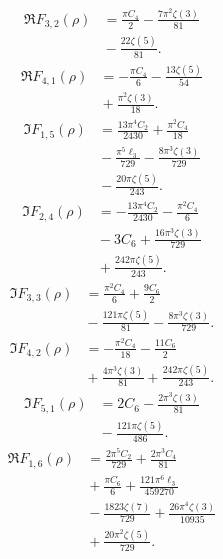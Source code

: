 \begin{align*}
\Re F_{3,2}(\rho) &=\frac{\pi C_{4}}{2}-\frac{7 \pi^{2} \zeta\left(3\right)}{81} \\
 &{}-\frac{22 \zeta\left(5\right)}{81}.
\end{align*}
\begin{align*}
\Re F_{4,1}(\rho) &=-\frac{\pi C_{4}}{6}-\frac{13 \zeta\left(5\right)}{54} \\
 &{}+\frac{\pi^{2} \zeta\left(3\right)}{18}.
\end{align*}
\begin{align*}
\Im F_{1,5}(\rho) &=\frac{13 \pi^{4} C_{2}}{2430}+\frac{\pi^{2} C_{4}}{18} \\
 &{}-\frac{\pi^{5} \ell_{3}}{729}-\frac{8 \pi^{3} \zeta\left(3\right)}{729} \\
 &{}-\frac{20 \pi \zeta\left(5\right)}{243}.
\end{align*}
\begin{align*}
\Im F_{2,4}(\rho) &=-\frac{13 \pi^{4} C_{2}}{2430}-\frac{\pi^{2} C_{4}}{6} \\
 &{}-3 C_{6}+\frac{16 \pi^{3} \zeta\left(3\right)}{729} \\
 &{}+\frac{242 \pi \zeta\left(5\right)}{243}.
\end{align*}
\begin{align*}
\Im F_{3,3}(\rho) &=\frac{\pi^{2} C_{4}}{6}+\frac{9 C_{6}}{2} \\
 &{}-\frac{121 \pi \zeta\left(5\right)}{81}-\frac{8 \pi^{3} \zeta\left(3\right)}{729}.
\end{align*}
\begin{align*}
\Im F_{4,2}(\rho) &=-\frac{\pi^{2} C_{4}}{18}-\frac{11 C_{6}}{2} \\
 &{}+\frac{4 \pi^{3} \zeta\left(3\right)}{81}+\frac{242 \pi \zeta\left(5\right)}{243}.
\end{align*}
\begin{align*}
\Im F_{5,1}(\rho) &=2 C_{6}-\frac{2 \pi^{3} \zeta\left(3\right)}{81} \\
 &{}-\frac{121 \pi \zeta\left(5\right)}{486}.
\end{align*}
\begin{align*}
\Re F_{1,6}(\rho) &=\frac{2 \pi^{5} C_{2}}{729}+\frac{2 \pi^{3} C_{4}}{81} \\
 &{}+\frac{\pi C_{6}}{6}+\frac{121 \pi^{6} \ell_{3}}{459270} \\
 &{}-\frac{1823 \zeta\left(7\right)}{729}+\frac{26 \pi^{4} \zeta\left(3\right)}{10935} \\
 &{}+\frac{20 \pi^{2} \zeta\left(5\right)}{729}.
\end{align*}
